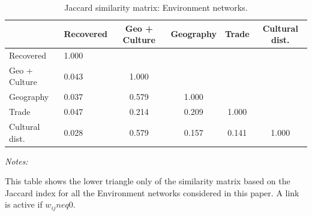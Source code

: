 \begin{table}[!h]
\centering
\caption{\label{tab:jaccard_similarity_environment}Jaccard similarity matrix: Environment networks.}
\centering
\fontsize{9}{11}\selectfont
\begin{threeparttable}
\begin{tabular}[t]{llcccc}
\toprule
  & Recovered & Geo + Culture & Geography & Trade & Cultural dist.\\
\midrule
Recovered & 1.000 &  &  &  & \\
Geo + Culture & 0.043 & 1.000 &  &  & \\
Geography & 0.037 & 0.579 & 1.000 &  & \\
Trade & 0.047 & 0.214 & 0.209 & 1.000 & \\
Cultural dist. & 0.028 & 0.579 & 0.157 & 0.141 & 1.000\\
\bottomrule
\end{tabular}
\begin{tablenotes}[para]
\item \textit{Notes:} 
\item This table shows the lower triangle only of the similarity matrix based on the Jaccard index for all the Environment networks considered in this paper. A link is active if $w_{ij} neq 0$.
\end{tablenotes}
\end{threeparttable}
\end{table}
